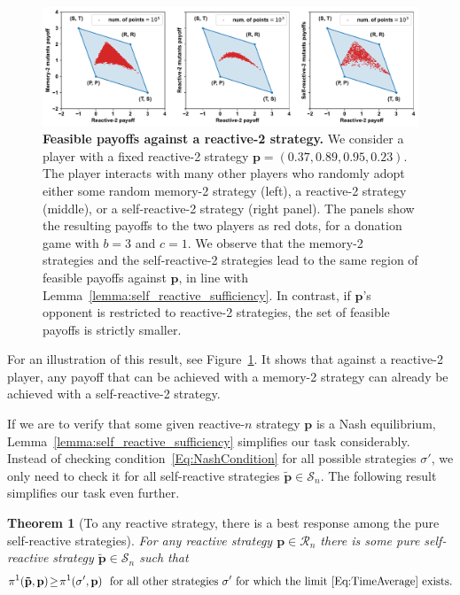 \documentclass[11pt]{article}
\theoremstyle{plainCl1}
\newtheorem{theorem}{Theorem}
\theoremstyle{plainCl2}
\begin{document}
\begin{figure}[t!]
    \centering
    \includegraphics[width=\textwidth]{figures/sufficiency_of_self_reactive_numerical_example_n_2.pdf}
    \caption{{\bf Feasible payoffs against a reactive-2 strategy.} We consider a player with a fixed reactive-2 strategy $\mathbf{p}\!=\!(0.37, 0.89, 0.95, 0.23)$. The player interacts with many other players who randomly adopt either some random memory-2 strategy (left), a reactive-2 strategy (middle), or a self-reactive-2 strategy (right panel). The panels show the resulting payoffs to the two players as red dots, for a donation game with  $b\!=\!3$ and $c\!=\!1$.
We observe that the memory-2 strategies and the self-reactive-2 strategies lead to the same region of feasible payoffs against $\mathbf{p}$, in line with Lemma~\ref{lemma:self_reactive_sufficiency}. In contrast, if $\mathbf{p}$'s opponent is restricted to reactive-2 strategies, the set of feasible payoffs is strictly smaller. 
}
    \label{fig:SelfReactiveSufficiency}
\end{figure}

\noindent
For an illustration of this result, see Figure~\ref{fig:SelfReactiveSufficiency}. It shows that against a reactive-2 player, any payoff that can be achieved with a memory-2 strategy can already be achieved with a self-reactive-2 strategy. 

If we are to verify that some given reactive-$n$ strategy $\mathbf{p}$ is a Nash equilibrium, Lemma~\ref{lemma:self_reactive_sufficiency} simplifies our task considerably. 
Instead of checking condition~\eqref{Eq:NashCondition} for all possible strategies $\sigma'$, we only need to check it for all self-reactive strategies $\mathbf{\tilde{p}}\!\in\! \mathcal{S}_n$. 
The following result simplifies our task even further. 

\begin{theorem}[To any reactive strategy, there is a best response among the pure self-reactive strategies]
\label{theorem:nash_against_pure_self_reactive} 
For any reactive strategy $\mathbf{p}\!\in\!\mathcal{R}_n$ there is some pure self-reactive strategy $\mathbf{\tilde p}\!\in\!\mathcal{S}_n$ such that 
 \begin{equation} \label{Eq:BRSelfReactive}
\pi^1(\mathbf{\tilde p},\mathbf{p}) \!\ge\! \pi^1(\sigma',\mathbf{p}) ~~\text{for all other strategies}~\sigma'~\text{for which the limit \eqref{Eq:TimeAverage} exists}. 
\end{equation}
\end{theorem}
\end{document}
